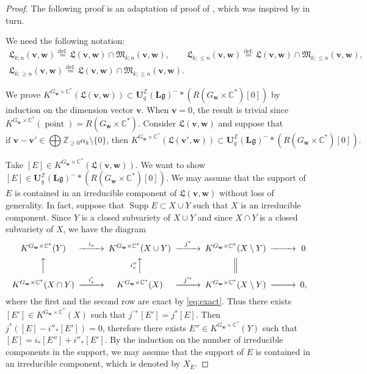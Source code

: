 \documentclass[12pt]{amsart}
\def\Bbb{\mathbb}
\def\frak{\mathfrak}
\theoremstyle{definition}
\theoremstyle{remark}
\numberwithin{equation}{subsection}
\newcommand{\defeq}{\overset{\operatorname{\scriptstyle def.}}{=}}
\newcommand{\C}{{\Bbb C}}
\newcommand{\Z}{{\Bbb Z}}
\newcommand{\M}{{\frak M}} %
\newcommand{\La}{{\frak L}} %
\newcommand{\bv}{{\mathbf v}} %
\newcommand{\bw}{{\mathbf w}} %
\newcommand{\Uli}{{\mathbf U}^{\Z}_q({\mathbf L}\mathfrak g)}
\begin{document}
\begin{proof}
The following proof is an adaptation of proof of \cite[10.2]{Na-alg},
which was inspired by \cite[3.6]{Lu-affine} in turn.

We need the following notation:
\begin{equation*}
\begin{gathered}
  \La_{k;n}(\bv,\bw) \defeq \La(\bv,\bw)\cap \M_{k;n}(\bv,\bw), \qquad
  \La_{k;\le n}(\bv,\bw) \defeq \La(\bv,\bw)\cap \M_{k;\le n}(\bv,\bw), \\
  \La_{k;\ge n}(\bv,\bw) \defeq \La(\bv,\bw)\cap \M_{k;\ge n}(\bv,\bw).
\end{gathered}
\end{equation*}

We prove $K^{G_\bw\times\C^*}(\La(\bv,\bw))\subset
\Uli^-\ast\left(R(G_\bw\times\C^*)[0]\right)$ by induction on the
dimension vector $\bv$.
%
When $\bv = 0$, the result is trivial since
$K^{G_\bw\times\C^*}(\operatorname{point}) =
R(G_\bw\times\C^*)$.
%
Consider $\La(\bv,\bw)$ and suppose that
\begin{equation}
\label{eq:indass}
\text{if $\bv - \bv'\in \bigoplus \Z_{\ge 0}\alpha_k \setminus \{0\}$,
then $K^{G_\bw\times\C^*}(\La(\bv',\bw))\subset
\Uli^-\ast\left(R(G_\bw\times\C^*)[0]\right)$.}
\end{equation}

Take $[E]\in K^{G_\bw\times\C^*}(\La(\bv,\bw))$. We want to show
$[E]\in \Uli^-\ast\left(R(G_\bw\times\C^*)[0]\right)$.
We may assume that the
support of $E$ is contained in an irreducible component of
$\La(\bv,\bw)$ without loss of generality. In fact, suppose that
$\operatorname{Supp}E\subset X\cup Y$ such that $X$ is an irreducible
component.
Since $Y$ is a closed subvariety of $X\cup Y$ and since $X\cap Y$ is a
closed subvariety of $X$, we have the diagram
\begin{equation*}
\begin{CD}
   K^{G_\bw\times\C^*}(Y) @>{i_*}>>
   K^{G_\bw\times\C^*}(X\cup Y) @>{j^*}>>
   K^{G_\bw\times\C^*}(X\setminus Y) @>>> 0 \\
   @AAA @A{i''_*}AA @| \\
   K^{G_\bw\times\C^*}(X\cap Y) @>{i'_*}>>
   K^{G_\bw\times\C^*}(X) @>{j^{\prime*}}>>
   K^{G_\bw\times\C^*}(X\setminus Y) @>>> 0,
\end{CD}
\end{equation*}
where the first and the second row are exact by \eqref{eq:exact}.
Thus there exists $[E']\in K^{G_\bw\times\C^*}(X)$ such that
$j^{\prime*}[E'] = j^*[E]$. Then $j^*([E] - i''_*[E']) = 0$, therefore
there exists $E''\in K^{G_\bw\times\C^*}(Y)$ such that
$[E] = i_*[E''] + i''_*[E']$. By the induction on the number of
irreducible components in the support, we may assume that the support
of $E$ is contained in an irreducible component, which is denoted by
$X_E$.


\end{proof}
\end{document}
